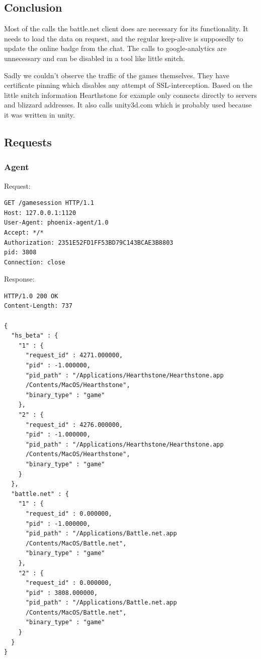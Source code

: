 \documentclass[12pt]{article}
\begin{document}
\subsection{Conclusion}

Most of the calls the battle.net client does are necessary for its functionality. It needs to load the data on request, and the regular keep-alive is supposedly to update the online badge from the chat. The calls to google-analytics are unnecessary and can be disabled in a tool like little snitch.

Sadly we couldn't observe the traffic of the games themselves. They have certificate pinning which disables any attempt of SSL-interception. Based on the little snitch information Hearthstone for example only connects directly to servers and blizzard addresses. It also calls unity3d.com which is probably used because it was written in unity. 

\subsection{Requests}
\subsubsection{Agent}
\label{sec:agent_request}

Request:
\begin{lstlisting}
GET /gamesession HTTP/1.1
Host: 127.0.0.1:1120
User-Agent: phoenix-agent/1.0
Accept: */*
Authorization: 2351E52FD1FF53BD79C143BCAE3B8803
pid: 3808
Connection: close
\end{lstlisting}
Response:
\begin{lstlisting}
HTTP/1.0 200 OK
Content-Length: 737

{
  "hs_beta" : {
    "1" : {
      "request_id" : 4271.000000,
      "pid" : -1.000000,
      "pid_path" : "/Applications/Hearthstone/Hearthstone.app
      /Contents/MacOS/Hearthstone",
      "binary_type" : "game"
    },
    "2" : {
      "request_id" : 4276.000000,
      "pid" : -1.000000,
      "pid_path" : "/Applications/Hearthstone/Hearthstone.app
      /Contents/MacOS/Hearthstone",
      "binary_type" : "game"
    }
  },
  "battle.net" : {
    "1" : {
      "request_id" : 0.000000,
      "pid" : -1.000000,
      "pid_path" : "/Applications/Battle.net.app
      /Contents/MacOS/Battle.net",
      "binary_type" : "game"
    },
    "2" : {
      "request_id" : 0.000000,
      "pid" : 3808.000000,
      "pid_path" : "/Applications/Battle.net.app
      /Contents/MacOS/Battle.net",
      "binary_type" : "game"
    }
  }
}
\end{lstlisting}
\end{document}
